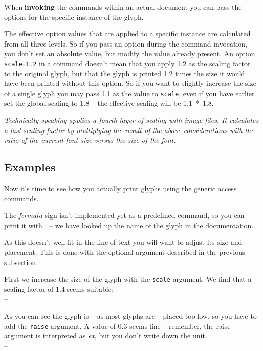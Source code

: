 \documentclass{article}
\begin{document}
When \textbf{invoking} the commands within an actual document you can pass the options for the specific instance of the glyph.

The effective option values that are applied to a specific instance are calculated from all three levels. 
So if you pass an option during the command invocation, you don't set an absolute value, but modify the value already present. 
An option \texttt{scale=1.2} in a command doesn't mean that you apply 1.2 as the scaling factor to the original glyph, but that the glyph is printed 1.2 times the size it would have been printed without this option.
So if you want to slightly increase the size of a single glyph you may pass 1.1 as the value to \texttt{scale}, even if you have earlier set the global scaling to 1.8 -- the effective scaling will be \mbox{1.1 * 1.8.}

\textit{Technically speaking \lilyglyphs{} applies a fourth layer of scaling with image files.
It calculates a last scaling factor by multiplying the result of the above considerations with the ratio of the current font size versus the size of the  font.}


\subsection{Examples}
\label{subsec:examples}
Now it's time to see how you actually print \emmentaler glyphs using the generic access commands.

The \emph{fermata} sign isn't implemented yet as a predefined command, so you can print it with :  -- we have looked up the name of the glyph in the documentation.
 
As this doesn't well fit in the line of text you will want to adjust its size and placement.
This is done with the optional argument described in the previous subsection.

First we increase the size of the glyph with the \texttt{scale} argument. We find that a scaling factor of 1.4 seems suitable:\\
 -- 

As you can see the glyph is -- as most \emmentaler glyphs are -- placed too low, so you have to add the \texttt{raise} argument. A value of 0.3 seems fine -- remember, the raise argument is interpreted as \emph{ex}, but you don't write down the unit.\\
  -- 
 
\end{document}
